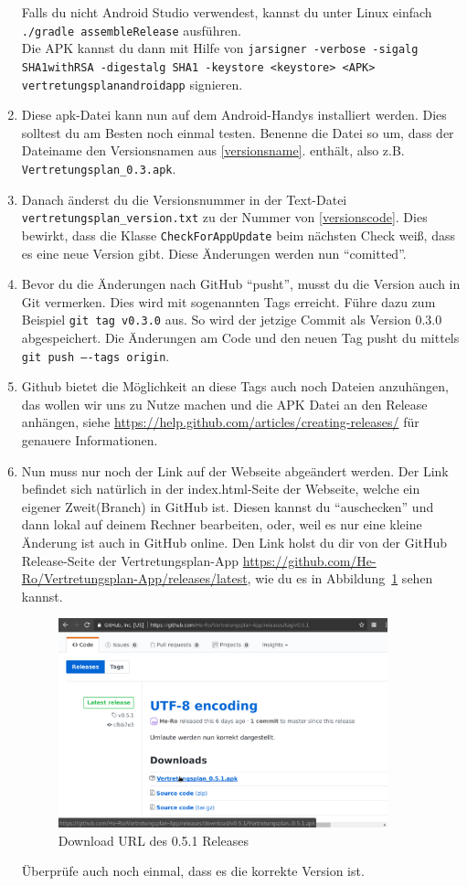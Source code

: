 \documentclass[12pt,headsepline]{scrartcl}
\begin{document}
\begin{enumerate}
Falls du nicht Android Studio verwendest, kannst du unter Linux einfach \texttt{./gradle assembleRelease} ausführen. \\
Die APK kannst du dann mit Hilfe von \texttt{jarsigner -verbose -sigalg SHA1withRSA -digestalg SHA1 -keystore <keystore> <APK> vertretungsplanandroidapp} signieren.
\item Diese apk-Datei kann nun auf dem Android-Handys installiert werden. Dies solltest du am Besten noch einmal testen. Benenne die Datei so um, dass der Dateiname den Versionsnamen aus \ref{versionsname}. enthält, also z.B. \texttt{Vertretungsplan\_0.3.apk}.
\item Danach änderst du die Versionsnummer in der Text-Datei \texttt{vertretungsplan\_version.txt} zu der Nummer von \ref{versionscode}.
Dies bewirkt, dass die Klasse \texttt{CheckForAppUpdate} beim nächsten Check weiß, dass es eine neue Version gibt.
Diese Änderungen werden nun ``comitted''.
\item Bevor du die Änderungen nach GitHub ``pusht'', musst du die Version auch in Git vermerken.
Dies wird mit sogenannten Tags erreicht.
Führe dazu zum Beispiel \texttt{git tag v0.3.0} aus.
So wird der jetzige Commit als Version 0.3.0 abgespeichert.
Die Änderungen am Code und den neuen Tag pusht du mittels \texttt{git push ----tags origin}.
\item Github bietet die Möglichkeit an diese Tags auch noch Dateien anzuhängen, das wollen wir uns zu Nutze machen und die APK Datei an den Release anhängen, siehe \url{https://help.github.com/articles/creating-releases/} für genauere Informationen.
\item Nun muss nur noch der Link auf der Webseite abgeändert werden. Der Link befindet sich natürlich in der index.html-Seite der Webseite, welche ein eigener Zweit(Branch) in GitHub ist.
Diesen kannst du ``auschecken'' und dann lokal auf deinem Rechner bearbeiten, oder, weil es nur eine kleine Änderung ist auch in GitHub online.
Den Link holst du dir von der GitHub Release-Seite der Vertretungsplan-App \url{https://github.com/He-Ro/Vertretungsplan-App/releases/latest}, wie du es in Abbildung~\ref{screenshot_download_url} sehen kannst.
\begin{figure}
\centering
\includegraphics[width=0.9\textwidth]{screenshot_tag_url}
\caption{Download URL des 0.5.1 Releases}
\label{screenshot_download_url}
\end{figure}
Überprüfe auch noch einmal, dass es die korrekte Version ist.
 \end{enumerate}
\end{document}
